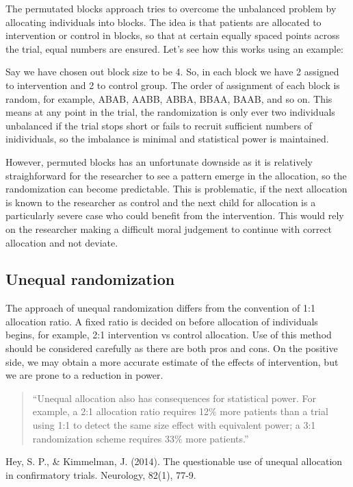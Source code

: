 \documentclass[]{book}
\begin{document}
The permutated blocks approach tries to overcome the unbalanced problem by allocating individuals into blocks. The idea is that patients are allocated to intervention or control in blocks, so that at certain equally spaced points across the trial, equal numbers are ensured. Let's see how this works using an example:

Say we have chosen out block size to be 4. So, in each block we have 2 assigned to intervention and 2 to control group. The order of assignment of each block is random, for example, ABAB, AABB, ABBA, BBAA, BAAB, and so on. This means at any point in the trial, the randomization is only ever two individuals unbalanced if the trial stops short or fails to recruit sufficient numbers of inidividuals, so the imbalance is minimal and statistical power is maintained.

However, permuted blocks has an unfortunate downside as it is relatively straighforward for the researcher to see a pattern emerge in the allocation, so the randomization can become predictable. This is problematic, if the next allocation is known to the researcher as control and the next child for allocation is a particularly severe case who could benefit from the intervention. This would rely on the researcher making a difficult moral judgement to continue with correct allocation and not deviate.

\hypertarget{unequal-randomization}{%
\subsection{Unequal randomization}\label{unequal-randomization}}

The approach of unequal randomization differs from the convention of 1:1 allocation ratio. A fixed ratio is decided on before allocation of individuals begins, for example, 2:1 intervention vs control allocation. Use of this method should be considered carefully as there are both pros and cons. On the positive side, we may obtain a more accurate estimate of the effects of intervention, but we are prone to a reduction in power.

\begin{quote}
``Unequal allocation also has consequences for statistical power. For example, a 2:1 allocation ratio requires 12\% more patients than a trial using 1:1 to detect the same size effect with equivalent power; a 3:1 randomization scheme requires 33\% more patients.''
\end{quote}

Hey, S. P., \& Kimmelman, J. (2014). The questionable use of unequal allocation in confirmatory trials. Neurology, 82(1), 77-9.
\end{document}
